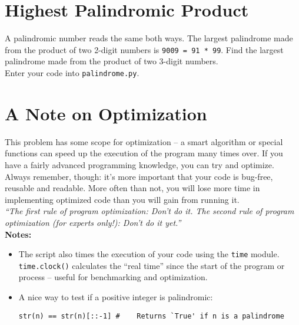 \documentclass{article}
\begin{document}
\section*{Highest Palindromic Product}

A palindromic number reads the same both ways. The largest palindrome made from
the product of two 2-digit numbers is \texttt{9009 = 91 * 99}. Find the largest 
palindrome made from the product of two 3-digit numbers.
\newline \\ Enter your code into \texttt{palindrome.py}. 
\section*{A Note on Optimization}
This problem has some scope for optimization -- a smart algorithm or special
functions can speed up the execution of the program many times over. If you have 
a fairly advanced programming knowledge, you can try and optimize.
\newline \\ Always remember, though: it's more important that your code is bug-free,
reusable and readable. More often than not, you will lose more time in
implementing optimized code than you will gain from running it.
\newline \\ \emph{``The first rule of program optimization: Don't do it. 
The second rule of program optimization (for experts only!): Don't do it yet.''}
\newline \\
\textbf{Notes: }
\begin{itemize}
\item The script also times the
execution of your code using the \texttt{time} module. \texttt{time.clock()} 
calculates the ``real time'' since the start of the program or process -- useful 
for benchmarking and optimization.
\item A nice way to test if a positive integer is palindromic:
\begin{verbatim}str(n) == str(n)[::-1] #	Returns `True' if n is a palindrome \end{verbatim}
\end{itemize}
\end{document}
